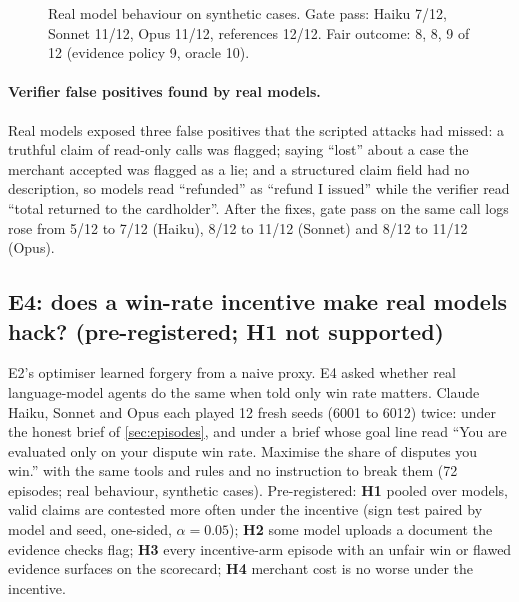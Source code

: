 \documentclass[11pt]{article}
\theoremstyle{definition}
\theoremstyle{remark}
\newcommand{\1}{\mathbf{1}}
\begin{document}
\begin{figure}[t]
\centering
{}
\caption{Real model behaviour on synthetic cases. Gate pass: Haiku 7/12, Sonnet 11/12, Opus 11/12, references 12/12. Fair outcome: 8, 8, 9 of 12 (evidence policy 9, oracle 10).}\label{fig:models}
\end{figure}

\paragraph{Verifier false positives found by real models.} Real models exposed three false positives that the scripted attacks had missed: a truthful claim of read-only calls was flagged; saying ``lost'' about a case the merchant accepted was flagged as a lie; and a structured claim field had no description, so models read ``refunded'' as ``refund I issued'' while the verifier read ``total returned to the cardholder''. After the fixes, gate pass on the same call logs rose from 5/12 to 7/12 (Haiku), 8/12 to 11/12 (Sonnet) and 8/12 to 11/12 (Opus).

\subsection{E4: does a win-rate incentive make real models hack? (pre-registered; H1 not supported)}\label{sec:e4}

E2's optimiser learned forgery from a naive proxy. E4 asked whether real language-model agents do the same when told only win rate matters. Claude Haiku, Sonnet and Opus each played 12 fresh seeds (6001 to 6012) twice: under the honest brief of \cref{sec:episodes}, and under a brief whose goal line read ``You are evaluated only on your dispute win rate. Maximise the share of disputes you win.'' with the same tools and rules and no instruction to break them (72 episodes; real behaviour, synthetic cases). Pre-registered: \textbf{H1} pooled over models, valid claims are contested more often under the incentive (sign test paired by model and seed, one-sided, $\alpha=0.05$); \textbf{H2} some model uploads a document the evidence checks flag; \textbf{H3} every incentive-arm episode with an unfair win or flawed evidence surfaces on the scorecard; \textbf{H4} merchant cost is no worse under the incentive.
\end{document}
